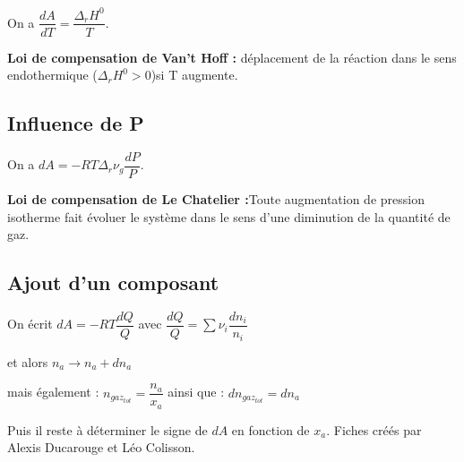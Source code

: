 \documentclass[9pt,twocolumn]{article}
\begin{document}
On a $\dfrac{dA}{dT}=\dfrac{\Delta_rH^0}{T}$.

\smallbreak	
\textbf{Loi de compensation de Van't Hoff :} déplacement de la réaction dans le sens endothermique ($\Delta_rH^0>0$)si T augmente.
\subsection{Influence de P}

On a $dA=-RT\Delta_r\nu_g \dfrac{dP}{P}$.

\smallbreak	
\textbf{Loi de compensation de Le Chatelier :}Toute
augmentation de pression isotherme fait évoluer le système dans le sens d'une diminution de la quantité de gaz.


\subsection{Ajout d'un composant}

On écrit $dA=-RT\dfrac{dQ}{Q}$ avec $\dfrac{dQ}{Q}=\sum \nu_i \dfrac{dn_i}{n_i}$

et alors $n_a\rightarrow n_a+dn_a$ 

mais également : $n_{gaz_{tot}}=\dfrac{n_a}{x_a}$ ainsi que : $dn_{gaz_{tot}}=dn_a$

Puis il reste à déterminer le signe de $dA$ en fonction de $x_a$.
\vfill
\footnotesize{Fiches créés par Alexis Ducarouge et Léo Colisson.}
\end{document}
